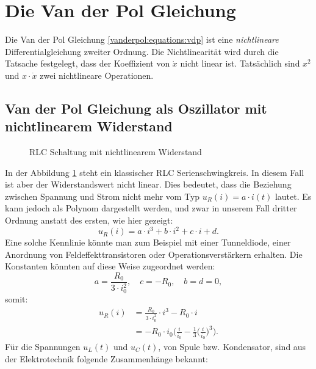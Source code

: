%
%
\section{Die Van der Pol Gleichung
\label{vanderpol:section:vdp_gleichung}}
Die Van der Pol Gleichung \eqref{vanderpol:equations:vdp} ist eine {\em nichtlineare} Differentialgleichung zweiter Ordnung. 
%
Die Nichtlinearität wird durch die Tatsache festgelegt, dass der Koeffizient von $\dot{x}$ nicht linear ist. Tatsächlich sind $x^{2}$ und $x \cdot \dot{x}$ zwei nichtlineare Operationen.

\subsection{Van der Pol Gleichung als Oszillator mit nichtlinearem Widerstand
\label{vanderpol:subsection:RLC}}
\begin{figure}
\centering
{} 
\caption{RLC Schaltung mit nichtlinearem Widerstand \label{vanderpol:figures:circuit}}
\end{figure}
In der Abbildung \ref{vanderpol:figures:circuit} steht ein klassischer RLC Serienschwingkreis. In diesem Fall ist aber der Widerstandswert nicht linear. Dies bedeutet, dass die Beziehung zwischen Spannung und Strom nicht mehr vom Typ $u_R(i) = a \cdot i(t)$ lautet. Es kann jedoch als Polynom dargestellt werden, und zwar in unserem Fall dritter Ordnung anstatt des ersten, wie hier gezeigt: 
%
%
%
%
%
%
\begin{equation}
u_R(i) = a \cdot i^3 + b \cdot i^2 + c \cdot i + d.
\end{equation}
Eine solche Kennlinie könnte man zum Beispiel mit einer Tunneldiode, einer Anordnung von Feldeffekttransistoren oder Operationsverstärkern erhalten. Die Konstanten könnten auf diese Weise zugeordnet werden:
%
%
%
%
\begin{equation*}
a = \frac{R_0}{3 \cdot i_0^2}, \quad c = -R_0, \quad b = d = 0,
\end{equation*}
somit:
\begin{align*}
u_R(i) &= \frac{R_0}{3 \cdot i_0^2} \cdot i^3 - R_0 \cdot i \\ 
&= -R_0 \cdot i_0 \biggl(\frac{i}{i_0} - \frac{1}{3} \biggl(\frac{i}{i_0} \biggr)^3 \biggr).  
\end{align*}
Für die Spannungen $u_{L}(t)$ und $u_{C}(t)$, von Spule bzw. Kondensator, sind aus der Elektrotechnik folgende Zusammenhänge bekannt:
%

